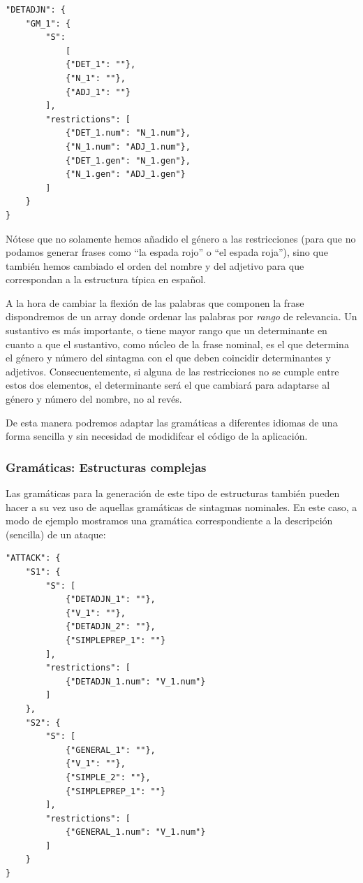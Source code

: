 \begin{lstlisting}[style=json]
"DETADJN": {
    "GM_1": {
        "S": 
            [
            {"DET_1": ""},
            {"N_1": ""},
            {"ADJ_1": ""}
        ],
        "restrictions": [
            {"DET_1.num": "N_1.num"},
            {"N_1.num": "ADJ_1.num"},
            {"DET_1.gen": "N_1.gen"},
            {"N_1.gen": "ADJ_1.gen"}
        ]
    }
}
\end{lstlisting}

\noindent Nótese que no solamente hemos añadido el género a las restricciones (para que no podamos generar frases como ``la espada rojo'' o ``el espada roja''), sino que también hemos cambiado el orden del nombre y del adjetivo para que correspondan a la estructura típica en español. 

A la hora de cambiar la flexión de las palabras que componen la frase dispondremos de un array donde ordenar las palabras por \textit{rango} de relevancia. Un sustantivo es más importante, o tiene mayor rango que un determinante en cuanto a que el sustantivo, como núcleo de la frase nominal, es el que determina el género y número del sintagma con el que deben coincidir determinantes y adjetivos. Consecuentemente, si alguna de las restricciones no se cumple entre estos dos elementos, el determinante será el que cambiará para adaptarse al género y número del nombre, no al revés.

De esta manera podremos adaptar las gramáticas a diferentes idiomas de una forma sencilla y sin necesidad de modidifcar el código de la aplicación.

\subsubsection{Gramáticas: Estructuras complejas}

Las gramáticas para la generación de este tipo de estructuras también pueden hacer a su vez uso de aquellas gramáticas de sintagmas nominales. En este caso, a modo de ejemplo mostramos una gramática correspondiente a la descripción (sencilla) de un ataque: 

\begin{lstlisting}[style=json]
"ATTACK": {
	"S1": {
	    "S": [
	        {"DETADJN_1": ""},
	        {"V_1": ""},
	        {"DETADJN_2": ""},
	        {"SIMPLEPREP_1": ""}
	    ],
	    "restrictions": [
	        {"DETADJN_1.num": "V_1.num"}
	    ]
	},
	"S2": {
	    "S": [
	        {"GENERAL_1": ""},
	        {"V_1": ""},
	        {"SIMPLE_2": ""},
	        {"SIMPLEPREP_1": ""}
	    ],
	    "restrictions": [
	        {"GENERAL_1.num": "V_1.num"}
	    ]
	}
}
\end{lstlisting}

